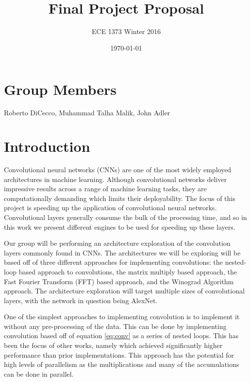 \documentclass[conference,compsoc]{IEEEtran/IEEEtran}
\title{\bf Final Project Proposal}
\author{ECE 1373 Winter 2016}
\date{\today}
\begin{document}
\maketitle

\section{Group Members}
Roberto DiCecco, Muhammad Talha Malik, John Adler

\section{Introduction}\label{section:intro}

Convolutional neural networks (CNNs) are one of the most widely employed architectures in machine learning. Although convolutional networks deliver impressive results across a range of machine learning tasks, they are computationally demanding which limits their deployability. The focus of this project is speeding up the application of convolutional neural networks. Convolutional layers generally consume the bulk of the processing time, and so in this work we present different engines to be used for speeding up these layers.

Our group will be performing an architecture exploration of the convolution layers commonly found in
CNNs. The architectures we will be exploring will be based off of three
different approaches for implementing convolutions: the nested-loop based approach to convolutions,
the matrix multiply based approach, the Fast Fourier Transform (FFT) based approach, and the Winograd Algorithm approach. The architecture
exploration will target multiple sizes of convolutional layers, with the network in question being AlexNet\cite{alexnet}.

One of the simplest approaches to implementing convolution is to implement it without any pre-processing of the data.
This can be done by implementing convolution based off of equation \ref{eq:conv} as a series of nested loops. This has been
the focus of other works, namely \cite{conv_zhang} which achieved significantly higher performance than prior implementations.
This approach has the potential for high levels of parallelism as the multiplications and many of the accumulations can be done
in parallel.
\end{document}
